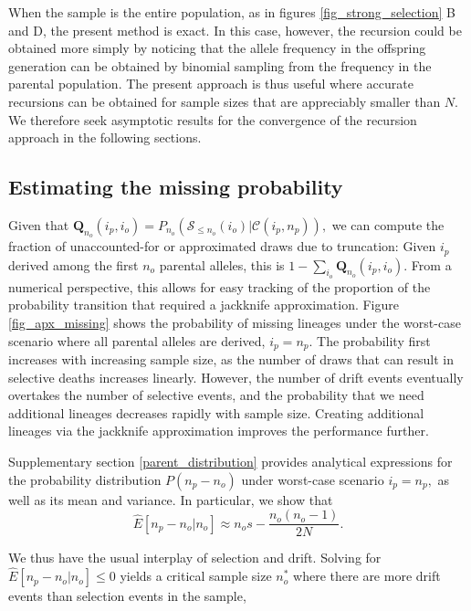 \documentclass[9pt,twocolumn,twoside,lineno]{gsajnl}
\begin{document}
When the sample is the entire population, as in figures \ref{fig_strong_selection} B and D, the
present method is exact. In this case, however, the recursion could be obtained more simply by noticing that the allele frequency in the offspring generation can be obtained by binomial sampling from the frequency in the parental population.  The present approach is thus useful where accurate recursions can be
obtained for sample sizes that are appreciably smaller than $N$. We therefore seek asymptotic results for the convergence of the recursion approach in the following sections.

\subsection{Estimating the missing probability}
\label{subsec_missing}


Given that $ \mathbf{Q}_{n_o}(i_p, i_o) = P_{n_o}(\mathcal{S}_{\leq n_o} (i_o)|
\mathcal{C}(i_p,n_p)),$ we can compute the fraction of unaccounted-for or approximated draws 
due to truncation:
Given $i_p$ derived among the first $n_o$ parental alleles, this is $1-\sum_{i_o} \mathbf{Q}_{n_o}(i_p,
i_o).$ From a numerical perspective, this allows for easy tracking of the proportion of the probability
transition that required a jackknife approximation. 
Figure \ref{fig_apx_missing} shows the probability of missing lineages under the worst-case
scenario where all parental alleles are derived, $i_p = n_p.$ 
The probability first increases with increasing sample size, as the number of draws that
can result in selective deaths increases linearly. However, the number of drift events eventually overtakes
the number of selective events, and the probability that we need additional lineages decreases
rapidly with sample size. Creating additional lineages via the jackknife approximation improves the performance further.

Supplementary section \ref{parent_distribution} provides analytical expressions for the probability distribution
$P(n_p-n_o) $ under worst-case scenario $i_p = n_p,$ as well as its
mean and variance. In particular, we show that
\begin{equation}
    \label{eq_lineages_approx}
    \hat{E}[n_p-n_o | n_o] \approx n_o  s - \frac{n_o (n_o-1) }{2N}.
\end{equation}

We thus have the usual interplay of selection and drift. Solving for $ \hat{E}[n_p -n_o | n_o]\leq0$
yields a critical sample size $n^*_o$ where there are more drift events than selection events in
the sample,
\end{document}
